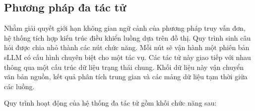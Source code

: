 \subsection{Phương pháp đa tác tử}
Nhằm giải quyết giới hạn không gian ngữ cảnh của phương pháp truy vấn đơn, hệ thống tích hợp kiến trúc điều khiển luồng dựa trên đồ thị. Quy trình sinh câu hỏi được chia nhỏ thành các nút chức năng. Mỗi nút sẽ vận hành một phiên bản sLLM có cấu hình chuyên biệt cho một tác vụ. Các tác tử này giao tiếp với nhau thông qua một cấu trúc dữ liệu trạng thái chung. Khối dữ liệu này vận chuyển văn bản nguồn, kết quả phân tích trung gian và các mảng dữ liệu tạm thời giữa các luồng.

%     

Quy trình hoạt động của hệ thống đa tác tử gồm khối chức năng sau:

